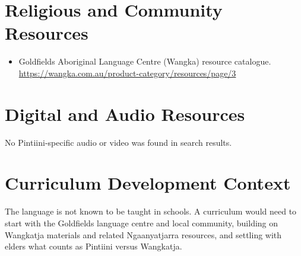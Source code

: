 \documentclass[12pt]{article}
\begin{document}
\section{Religious and Community Resources}
\begin{itemize}
\item Goldfields Aboriginal Language Centre (Wangka) resource catalogue. \url{https://wangka.com.au/product-category/resources/page/3}
\end{itemize}

\section{Digital and Audio Resources}
No Pintiini-specific audio or video was found in search results.

\section{Curriculum Development Context}
The language is not known to be taught in schools. A curriculum would need to start with the Goldfields language centre and local community, building on Wangkatja materials and related Ngaanyatjarra resources, and settling with elders what counts as Pintiini versus Wangkatja.
\end{document}
